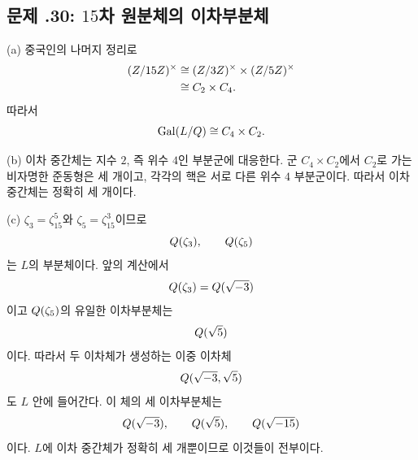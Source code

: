 \subsection*{문제 \thechapter.30: $15$차 원분체의 이차부분체}

\begin{solution}
(a) 중국인의 나머지 정리로
\[
\begin{aligned}
  (Z/15Z)^\times
  &\cong(Z/3Z)^\times
     \times(Z/5Z)^\times\\
  &\cong C_2\times C_4.
\end{aligned}
\]
따라서
\[
  \operatorname{Gal}(L/Q)\cong C_4\times C_2.
\]

(b) 이차 중간체는 지수 $2$, 즉 위수 $4$인 부분군에 대응한다. 군 $C_4\times C_2$에서 $C_2$로 가는 비자명한 준동형은 세 개이고, 각각의 핵은 서로 다른 위수 $4$ 부분군이다. 따라서 이차 중간체는 정확히 세 개이다.

(c) $\zeta_3=\zeta_{15}^5$와 $\zeta_5=\zeta_{15}^3$이므로
\[
  Q(\zeta_3),\qquad Q(\zeta_5)
\]
는 $L$의 부분체이다. 앞의 계산에서
\[
  Q(\zeta_3)=Q(\sqrt{-3})
\]
이고 $Q(\zeta_5)$의 유일한 이차부분체는
\[
  Q(\sqrt5)
\]
이다. 따라서 두 이차체가 생성하는 이중 이차체
\[
  Q(\sqrt{-3},\sqrt5)
\]
도 $L$ 안에 들어간다. 이 체의 세 이차부분체는
\[
  Q(\sqrt{-3}),
  \qquad
  Q(\sqrt5),
  \qquad
  Q(\sqrt{-15})
\]
이다. $L$에 이차 중간체가 정확히 세 개뿐이므로 이것들이 전부이다.
\end{solution}
